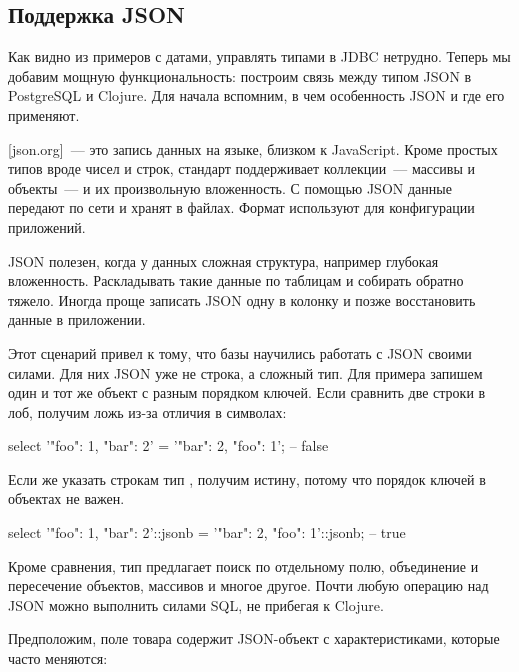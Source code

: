 \subsection{Поддержка JSON}

Как видно из примеров с датами, управлять типами в JDBC нетрудно. Теперь мы добавим мощную функциональность: построим связь между типом JSON в PostgreSQL и Clojure. Для начала вспомним, в чем особенность JSON и где его применяют.

\def\urljsonorg{https://www.json.org/json-en.html}

\footurl{JSON}{\urljsonorg}[json.org]~--- это запись данных на языке, близком к JavaScript. Кроме простых типов вроде чисел и строк, стандарт поддерживает коллекции~--- массивы и объекты~--- и их произвольную вложенность. С помощью JSON данные передают по сети и хранят в файлах. Формат используют для конфигурации приложений.

JSON полезен, когда у данных сложная структура, например глубокая вложенность. Раскладывать такие данные по таблицам и собирать обратно тяжело. Иногда проще записать JSON одну в колонку и позже восстановить данные в приложении.

Этот сценарий привел к тому, что базы научились работать с JSON своими силами. Для них JSON уже не строка, а сложный тип. Для примера запишем один и тот же объект с разным порядком ключей. Если сравнить две строки в лоб, получим ложь из-за отличия в символах:

\begin{english}
  \begin{sql}
select '{"foo": 1, "bar": 2}' = '{"bar": 2, "foo": 1}';
-- false
  \end{sql}
\end{english}

Если же указать строкам тип , получим истину, потому что порядок ключей в объектах не важен.

\begin{english}
  \begin{sql}
select '{"foo": 1, "bar": 2}'::jsonb = '{"bar": 2, "foo": 1}'::jsonb;
-- true
  \end{sql}
\end{english}

Кроме сравнения, тип  предлагает поиск по отдельному полю, объединение и пересечение объектов, массивов и многое другое. Почти любую операцию над JSON можно выполнить силами SQL, не прибегая к Clojure.

Предположим, поле  товара содержит JSON-объект с характеристиками, которые часто меняются:

